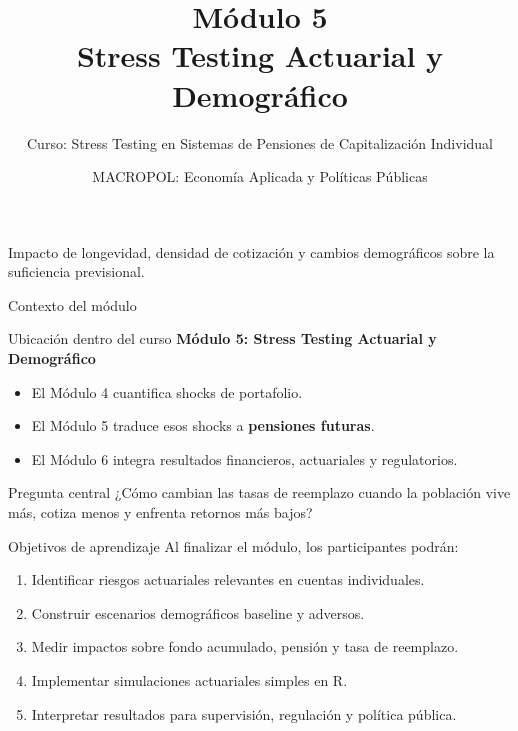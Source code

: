 \documentclass[aspectratio=169,11pt]{beamer}
\title[Stress Testing Actuarial]{Módulo 5\\Stress Testing Actuarial y Demográfico}
\subtitle{Curso: Stress Testing en Sistemas de Pensiones de Capitalización Individual}
\author{MACROPOL: Economía Aplicada y Políticas Públicas}
\date{}
\begin{document}
\begin{frame}
  \titlepage
  \vspace{-0.3cm}
  \begin{center}
    \small Impacto de longevidad, densidad de cotización y cambios demográficos sobre la suficiencia previsional.
  \end{center}
\end{frame}

\begin{frame}{Contexto del módulo}
\begin{block}{Ubicación dentro del curso}
\textbf{Módulo 5: Stress Testing Actuarial y Demográfico}
\end{block}

\begin{itemize}
  \item El Módulo 4 cuantifica shocks de portafolio.
  \item El Módulo 5 traduce esos shocks a \textbf{pensiones futuras}.
  \item El Módulo 6 integra resultados financieros, actuariales y regulatorios.
\end{itemize}

\vspace{0.2cm}
\begin{alertblock}{Pregunta central}
¿Cómo cambian las tasas de reemplazo cuando la población vive más, cotiza menos y enfrenta retornos más bajos?
\end{alertblock}
\end{frame}

\begin{frame}{Objetivos de aprendizaje}
Al finalizar el módulo, los participantes podrán:

\begin{enumerate}
  \item Identificar riesgos actuariales relevantes en cuentas individuales.
  \item Construir escenarios demográficos baseline y adversos.
  \item Medir impactos sobre fondo acumulado, pensión y tasa de reemplazo.
  \item Implementar simulaciones actuariales simples en R.
  \item Interpretar resultados para supervisión, regulación y política pública.
\end{enumerate}
\end{frame}
\end{document}
